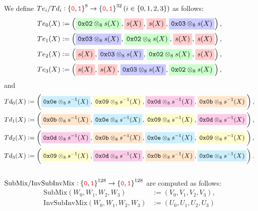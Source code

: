 \newpage
We define $Te_i/Td_i:\set{\textcolor{red}{\texttt{0}},\textcolor{red}{\texttt{1}}}^{8}\to\set{\textcolor{red}{\texttt{0}},\textcolor{red}{\texttt{1}}}^{32} (i\in\set{0,1,2,3})$ as follows:
\begin{align*}
Te_0(X)&:=\left(\mathcolorbox{green!20}{\texttt{0x02}\otimes_8 s(X)},\mathcolorbox{red!20}{s(X)},\mathcolorbox{red!20}{s(X)},\mathcolorbox{blue!20}{\texttt{0x03}\otimes_8 s(X)}\right),\\
Te_1(X)&:=\left(\mathcolorbox{blue!20}{\texttt{0x03}\otimes_8 s(X)},\mathcolorbox{green!20}{\texttt{0x02}\otimes_8 s(X)},\mathcolorbox{red!20}{s(X)},\mathcolorbox{red!20}{s(X)}\right),\\
Te_2(X)&:=\left(\mathcolorbox{red!20}{s(X)}, \mathcolorbox{blue!20}{\texttt{0x03}\otimes_8 s(X)}, \mathcolorbox{green!20}{\texttt{0x02}\otimes_8 s(X)}, \mathcolorbox{red!20}{s(X)}\right),\\
Te_3(X)&:=\left(\mathcolorbox{red!20}{s(X)}, \mathcolorbox{red!20}{s(X)}, \mathcolorbox{blue!20}{\texttt{0x03}\otimes_8 s(X)}, \mathcolorbox{green!20}{\texttt{0x02}\otimes_8 s(X)}\right),
\end{align*}
and \begin{align*}
Td_0(X)&:=\left(\mathcolorbox{cyan!20}{\texttt{0x0e}\otimes_8 s^{-1}(X)}, \mathcolorbox{yellow!20}{\texttt{0x09}\otimes_8 s^{-1}(X)}, \mathcolorbox{magenta!20}{\texttt{0x0d}\otimes_8 s^{-1}(X)}, \mathcolorbox{orange!20}{\texttt{0x0b}\otimes_8 s^{-1}(X)}\right),\\
Td_1(X)&:=\left(\mathcolorbox{orange!20}{\texttt{0x0b}\otimes_8 s^{-1}(X)}, \mathcolorbox{cyan!20}{\texttt{0x0e}\otimes_8 s^{-1}(X)}, \mathcolorbox{yellow!20}{\texttt{0x09}\otimes_8 s^{-1}(X)}, \mathcolorbox{magenta!20}{\texttt{0x0d}\otimes_8 s^{-1}(X)}\right),\\
Td_2(X)&:=\left(\mathcolorbox{magenta!20}{\texttt{0x0d}\otimes_8 s^{-1}(X)}, \mathcolorbox{orange!20}{\texttt{0x0b}\otimes_8 s^{-1}(X)}, \mathcolorbox{cyan!20}{\texttt{0x0e}\otimes_8 s^{-1}(X)}, \mathcolorbox{yellow!20}{\texttt{0x09}\otimes_8 s^{-1}(X)} \right),\\
Td_3(X)&:=\left(\mathcolorbox{yellow!20}{\texttt{0x09}\otimes_8 s^{-1}(X)}, \mathcolorbox{magenta!20}{\texttt{0x0d}\otimes_8 s^{-1}(X)}, \mathcolorbox{orange!20}{\texttt{0x0b}\otimes_8 s^{-1}(X)}, \mathcolorbox{cyan!20}{\texttt{0x0e}\otimes_8 s^{-1}(X)}\right).
\end{align*}
\\
$\text{SubMix}/\text{InvSubInvMix}:\set{\textcolor{red}{\texttt{0}},\textcolor{red}{\texttt{1}}}^{128}\to\set{\textcolor{red}{\texttt{0}},\textcolor{red}{\texttt{1}}}^{128}$ are computed as follows: \begin{align*}
	\text{SubMix}(W_0,W_1,W_2,W_3)&:=(V_0,V_1,V_2,V_3), \\
	\text{InvSubInvMix}(W_0,W_1,W_2,W_3)&:=(U_0,U_1,U_2,U_3)
\end{align*}
